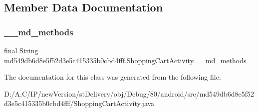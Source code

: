 \subsection{Member Data Documentation}
\mbox{\label{classmd549db6d8e5f52d3e5c415335b0cbd4fff_1_1_shopping_cart_activity_a5fa40bbcc99c172a57445a1f47379e6b}} 
\subsubsection{\texorpdfstring{\+\_\+\+\_\+md\+\_\+methods}{\_\_md\_methods}}
{\footnotesize\ttfamily final String md549db6d8e5f52d3e5c415335b0cbd4fff.\+Shopping\+Cart\+Activity.\+\_\+\+\_\+md\+\_\+methods\hspace{0.3cm}{\ttfamily [static]}}



The documentation for this class was generated from the following file\+:\begin{DoxyCompactItemize}
\item 
D\+:/\+A.\+C/\+I\+P/new\+Version/st\+Delivery/obj/\+Debug/80/android/src/md549db6d8e5f52d3e5c415335b0cbd4fff/Shopping\+Cart\+Activity.\+java\end{DoxyCompactItemize}
